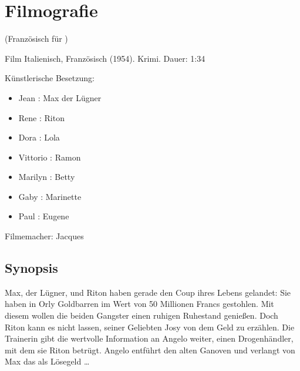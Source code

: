 \section{Filmografie\label{preamble-filmography}}

 (Französisch für )

Film Italienisch, Französisch (1954). Krimi. Dauer: 1:34

Künstlerische Besetzung:

\begin{itemize}\itemsep=-3pt
    \item Jean : Max der Lügner
    \item Rene : Riton
    \item Dora : Lola
    \item Vittorio : Ramon
    \item Marilyn : Betty
    \item Gaby : Marinette
    \item Paul : Eugene
\end{itemize}

Filmemacher: Jacques 

\subsection*{Synopsis}


Max, der Lügner, und Riton haben gerade den Coup ihres Lebens gelandet: Sie haben in Orly Goldbarren im Wert von 50 Millionen Francs gestohlen. Mit diesem  wollen die beiden Gangster einen ruhigen Ruhestand genießen. Doch Riton kann es nicht lassen, seiner Geliebten Josy von dem Geld zu erzählen. Die Trainerin gibt die wertvolle Information an Angelo weiter, einen Drogenhändler, mit dem sie Riton betrügt. Angelo entführt den alten Ganoven und verlangt von Max das  als Lösegeld \dots{}

